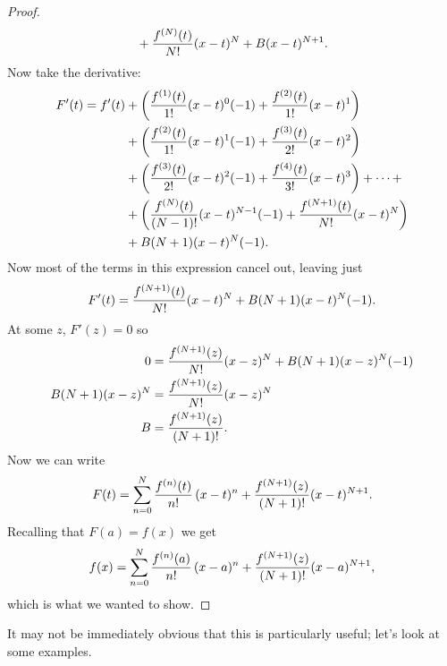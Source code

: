 \begin{proof}
\begin{align*}
  &+{f^{(N)}(t)\over N!}(x-t)^N+
  B(x-t)^{N+1}. \\
\end{align*}
Now take the derivative:
\begin{align*}
  F'(t) = f'(t) &+ 
  \left({f^{(1)}(t)\over 1!}(x-t)^0(-1)+{f^{(2)}(t)\over
    1!}(x-t)^1\right) \\
  &+\left({f^{(2)}(t)\over 1!}(x-t)^1(-1)+{f^{(3)}(t)\over
    2!}(x-t)^2\right) \\
  &+\left({f^{(3)}(t)\over 2!}(x-t)^2(-1)+{f^{(4)}(t)\over
    3!}(x-t)^3\right)+\dots+ \\
  &+\left({f^{(N)}(t)\over (N-1)!}(x-t)^{N-1}(-1)+{f^{(N+1)}(t)\over
    N!}(x-t)^N\right) \\
  &+B(N+1)(x-t)^N(-1). \\
\end{align*}
Now most of the terms in this expression cancel out,
leaving just
$$F'(t) = {f^{(N+1)}(t)\over N!}(x-t)^N+B(N+1)(x-t)^N(-1).$$
At some $z$, $F'(z)=0$ so
\begin{align*}
  0&={f^{(N+1)}(z)\over N!}(x-z)^N+B(N+1)(x-z)^N(-1) \\
  B(N+1)(x-z)^N&={f^{(N+1)}(z)\over N!}(x-z)^N \\
  B&={f^{(N+1)}(z)\over (N+1)!}. \\
\end{align*}
Now we can write 
$$
  F(t)=\sum_{n=0}^N{f^{(n)}(t)\over n!}\,(x-t)^n + 
  {f^{(N+1)}(z)\over (N+1)!}(x-t)^{N+1}.
$$
Recalling that $F(a)=f(x)$ we get
$$
  f(x)=\sum_{n=0}^N{f^{(n)}(a)\over n!}\,(x-a)^n + 
  {f^{(N+1)}(z)\over (N+1)!}(x-a)^{N+1},
$$
which is what we wanted to show.
\end{proof}

It may not be immediately obvious that this is particularly useful;
let's look at some examples.

